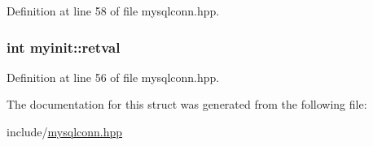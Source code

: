 Definition at line 58 of file mysqlconn.\-hpp.

\hypertarget{structmyinit_ab7400d7727260819f731e0becd418539}{
\subsubsection[{retval}]{\setlength{\rightskip}{0pt plus 5cm}int myinit\-::retval}}\label{structmyinit_ab7400d7727260819f731e0becd418539}


Definition at line 56 of file mysqlconn.\-hpp.



The documentation for this struct was generated from the following file\-:\begin{DoxyCompactItemize}
\item 
include/\hyperlink{mysqlconn_8hpp}{mysqlconn.\-hpp}\end{DoxyCompactItemize}
